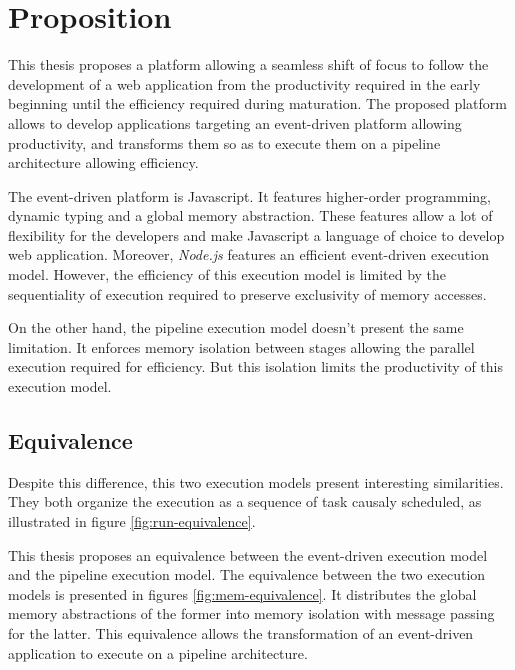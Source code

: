 \section{Proposition} \label{chapter4:proposition}

This thesis proposes a platform allowing a seamless shift of focus to follow the development of a web application from the productivity required in the early beginning until the efficiency required during maturation.
The proposed platform allows to develop applications targeting an event-driven platform allowing productivity, and transforms them so as to execute them on a pipeline architecture allowing efficiency.

The event-driven platform is Javascript.
It features higher-order programming, dynamic typing and a global memory abstraction.
These features allow a lot of flexibility for the developers and make Javascript a language of choice to develop web application.
Moreover, \textit{Node.js} features an efficient event-driven execution model.
However, the efficiency of this execution model is limited by the sequentiality of execution required to preserve exclusivity of memory accesses.

On the other hand, the pipeline execution model doesn't present the same limitation.
It enforces memory isolation between stages allowing the parallel execution required for efficiency.
But this isolation limits the productivity of this execution model.

\subsection{Equivalence}

Despite this difference, this two execution models present interesting similarities.
They both organize the execution as a sequence of task causaly scheduled, as illustrated in figure \ref{fig:run-equivalence}.

This thesis proposes an equivalence between the event-driven execution model and the pipeline execution model.
The equivalence between the two execution models is presented in figures \ref{fig:mem-equivalence}.
It distributes the global memory abstractions of the former into memory isolation with message passing for the latter.
This equivalence allows the transformation of an event-driven application to execute on a pipeline architecture.

